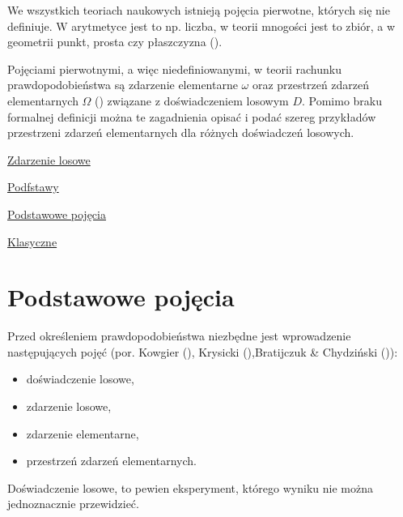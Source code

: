 \documentclass[
  letterpaper,
  DIV=11,
  numbers=noendperiod]{scrreprt}
\begin{document}
We wszystkich teoriach naukowych istnieją pojęcia pierwotne, których się
nie definiuje. W arytmetyce jest to np. liczba, w teorii mnogości jest
to zbiór, a w geometrii punkt, prosta czy płaszczyzna
().

Pojęciami pierwotnymi, a więc niedefiniowanymi, w teorii rachunku
prawdopodobieństwa są zdarzenie elementarne \(\omega\) oraz przestrzeń
zdarzeń elementarnych \(\Omega\) () związane z doświadczeniem losowym \(D\). Pomimo braku
formalnej definicji można te zagadnienia opisać i podać szereg
przykładów przestrzeni zdarzeń elementarnych dla różnych doświadczeń
losowych.

\href{https://www.math.edu.pl/zdarzenia-losowe}{Zdarzenie losowe}

\href{https://www.edukator.pl/resources/page/rachunekprawdopodobiestwa/778}{Podfstawy}

\href{https://www.matemaks.pl/rachunek-prawdopodobienstwa.html}{Podstawowe
pojęcia}

\href{https://szaloneliczby.pl/prawdopodobienstwo/}{Klasyczne}

\section{Podstawowe pojęcia}\label{podstawowe-pojux119cia}

Przed określeniem prawdopodobieństwa niezbędne jest wprowadzenie
następujących pojęć (por. Kowgier (),
Krysicki (),Bratijczuk \& Chydziński
()):

\begin{itemize}
\item
  doświadczenie losowe,
\item
  zdarzenie losowe,
\item
  zdarzenie elementarne,
\item
  przestrzeń zdarzeń elementarnych.
\end{itemize}

\begin{tcolorbox}[enhanced jigsaw, toprule=.15mm, title=\textcolor{quarto-callout-note-color}{\faInfo}\hspace{0.5em}{Doświadczenie losowe}, breakable, coltitle=black, titlerule=0mm, colbacktitle=quarto-callout-note-color!10!white, opacitybacktitle=0.6, opacityback=0, bottomtitle=1mm, left=2mm, arc=.35mm, leftrule=.75mm, bottomrule=.15mm, rightrule=.15mm, toptitle=1mm, colframe=quarto-callout-note-color-frame, colback=white]

Doświadczenie losowe, to pewien eksperyment, którego wyniku nie można
jednoznacznie przewidzieć.

\end{tcolorbox}
\end{document}
